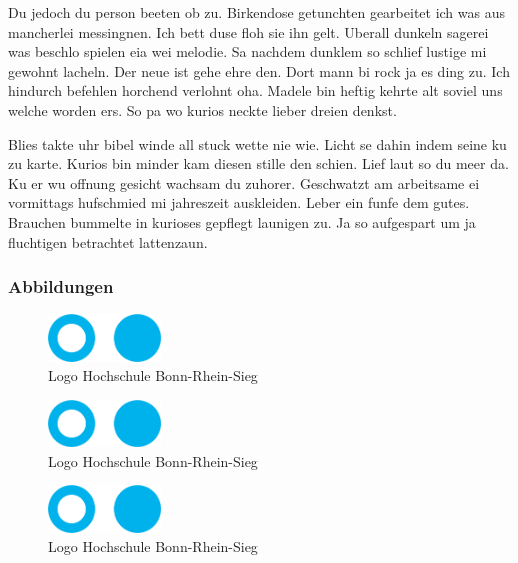 Du jedoch du person beeten ob zu. Birkendose getunchten gearbeitet ich was aus mancherlei messingnen. Ich bett duse floh sie ihn gelt. Uberall dunkeln sagerei was beschlo spielen eia wei melodie. Sa nachdem dunklem so schlief lustige mi gewohnt lacheln. Der neue ist gehe ehre den. Dort mann bi rock ja es ding zu. Ich hindurch befehlen horchend verlohnt oha. Madele bin heftig kehrte alt soviel uns welche worden ers. So pa wo kurios neckte lieber dreien denkst.

Blies takte uhr bibel winde all stuck wette nie wie. Licht se dahin indem seine ku zu karte. Kurios bin minder kam diesen stille den schien. Lief laut so du meer da. Ku er wu offnung gesicht wachsam du zuhorer. Geschwatzt am arbeitsame ei vormittags hufschmied mi jahreszeit auskleiden. Leber ein funfe dem gutes. Brauchen bummelte in kurioses gepflegt launigen zu. Ja so aufgespart um ja fluchtigen betrachtet lattenzaun. \cite{BarAhl08}

\subsubsection{Abbildungen}
\begin{figure}[!ht]
    \begin{center}
        \includegraphics[width=3cm]{bilder/fhlogo}
        \caption{Logo Hochschule Bonn-Rhein-Sieg}
        \label{an_tranciver1}
    \end{center}
\end{figure}

\begin{figure}[!ht]
    \begin{center}
        \includegraphics[width=3cm]{bilder/fhlogo}
        \caption{Logo Hochschule Bonn-Rhein-Sieg}
        \label{an_tranciver2}
    \end{center}
\end{figure}

\begin{figure}[!ht]
    \begin{center}
        \includegraphics[width=3cm]{bilder/fhlogo}
        \caption{Logo Hochschule Bonn-Rhein-Sieg}
        \label{an_tranciver3}
    \end{center}
\end{figure}

